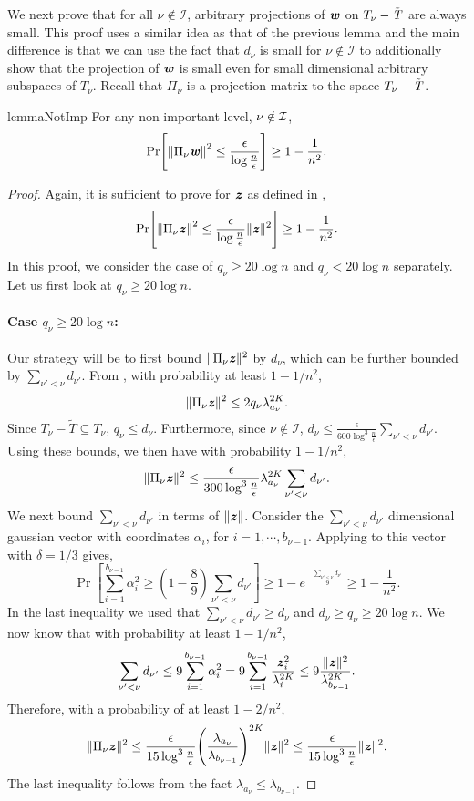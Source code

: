 We next prove that for all $\nu\notin \mathcal{I}$, arbitrary projections of $\boldsymbol{\mathit{w}}$ on $T_{\nu}-{\tilde{\mathit{T}}}$ are always small. This proof uses a similar idea as that of the previous lemma and the main difference is that we can use the fact that $d_{\nu}$ is small for $\nu\notin \mathcal{I}$ to additionally show that the projection of $\boldsymbol{\mathit{w}}$ is small even for small dimensional arbitrary subspaces of $T_{\nu}$. Recall that $\Pi_\nu$ is a projection matrix to the space $T_{\nu}-{\tilde{\mathit{T}}}$.
%
\begin{restatable}{lemma}{NotImp}\label{lem:NotImp}
For any non-important level, $\nu \notin \cal{I}$,
\[
\Pr\left[\norm{\Pi_{\nu}\ww}^2 \leq \frac{\epsilon}{\log\frac{n}{\epsilon}} \right] \geq 1-\frac{1}{n^{2}}.
\]
\end{restatable}

\begin{proof}
Again, it is sufficient to prove for $\boldsymbol{\mathit{z}}$ as defined in ,
\[
\Pr\left[\norm{\Pi_{\nu}\zz}^2 \leq \frac{\epsilon}{\log\frac{n}{\epsilon}}\|\zz\|^2 \right] \geq 1-\frac{1}{n^{2}}.
\]
In this proof, we consider the case of $q_{\nu}\geq 20\log n$ and $q_{\nu}<20\log n$ separately. Let us first look at $q_{\nu}\geq 20\log n$.
\paragraph{Case $q_{\nu}\geq 20\log n$:}
Our strategy will be to first bound $\|\Pi_{\nu}\boldsymbol{\mathit{z}}\|^2$ by $d_{\nu}$, which can be further bounded by $\sum_{\nu'<\nu}d_{\nu'}$.
From , with probability at least $1-1/n^2$,
\[
\|\Pi_{\nu}\boldsymbol{\mathit{z}}\|^2 \leq 2q_{\nu}\lambda_{a_{\nu}}^{2K}.
\]
Since $T_{\nu}-\tilde{T}\subseteq T_{\nu}$, $q_{\nu}\leq d_{\nu}$. Furthermore, since $\nu \notin \mathcal{I}$, $d_{\nu}\leq \frac{\epsilon}{600\log^3 \frac{n}{\epsilon}}\sum_{\nu'<\nu}d_{\nu'}$. Using these bounds, we then have with probability $1-1/n^2$,  
\[
\|\Pi_{\nu}\boldsymbol{\mathit{z}}\|^2 \leq \frac{\epsilon}{300\log^3 \frac{n}{\epsilon}}\lambda_{a_{\nu}}^{2K}\sum_{\nu'<\nu}d_{\nu'}.
\]
We next bound $\sum_{\nu'<\nu}d_{\nu'}$ in terms of $\|\boldsymbol{\mathit{z}}\|$. Consider the $\sum_{\nu'<\nu}d_{\nu'}$ dimensional gaussian vector with coordinates $\alpha_i$, for $i = 1, \cdots, b_{\nu-1}$. Applying  to this vector with $\delta=1/3$ gives,
\[
\Pr\left[\sum_{i=1}^{b_{\nu-1}} \alpha_i^2 \geq \left(1-\frac{8}{9}\right)\sum_{\nu'<\nu}d_{\nu'}\right] \geq 1- e^{-\frac{\sum_{\nu'<\nu}d_{\nu'}}{9}} \geq 1-\frac{1}{n^2}.
\]
In the last inequality we used that $\sum_{\nu'<\nu}d_{\nu'}\geq d_{\nu}$ and $d_{\nu}\geq q_{\nu}\geq 20\log n$. We now know that with probability at least $1-1/n^2$,
\[
\sum_{\nu'<\nu}d_{\nu'} \leq 9\sum_{i=1}^{b_{\nu-1}}\alpha_i^2 = 9\sum_{i=1}^{b_{\nu-1}}\frac{\boldsymbol{\mathit{z}}_i^2}{\lambda_i^{2K} }\leq 9\frac{\|\boldsymbol{\mathit{z}}\|^2}{\lambda_{b_{\nu-1}}^{2K}}.
\]
Therefore, with a probability of at least $1-2/n^2$,
\[
\|\Pi_{\nu}\zz\|^2 \leq \frac{\epsilon}{15\log^3 \frac{n}{\epsilon}}\left(\frac{\lambda_{a_{\nu}}}{\lambda_{b_{\nu-1}}}\right)^{2K}\|\zz\|^2 \leq  \frac{\epsilon}{15\log^3 \frac{n}{\epsilon}}\|\zz\|^2.
\]
The last inequality follows from the fact $\lambda_{a_{\nu}} \leq \lambda_{b_{\nu-1}}$.

\end{proof}
